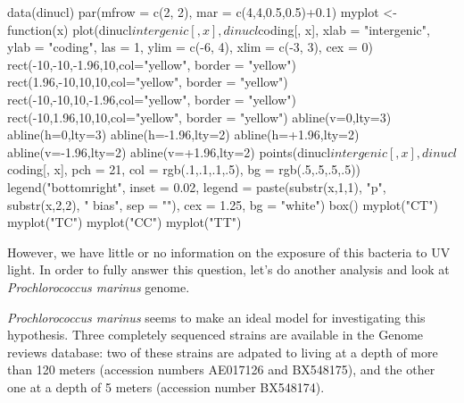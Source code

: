 \documentclass{article}
\begin{document}
\begin{Schunk}
\begin{Sinput}
 data(dinucl)
 par(mfrow = c(2, 2), mar = c(4,4,0.5,0.5)+0.1)
 myplot <- function(x){
   plot(dinucl$intergenic[, x], dinucl$coding[, x],
   xlab = "intergenic", ylab = "coding", 
   las = 1, ylim = c(-6, 4), 
   xlim = c(-3, 3), cex = 0)
   rect(-10,-10,-1.96,10,col="yellow", border = "yellow")
   rect(1.96,-10,10,10,col="yellow", border = "yellow")
   rect(-10,-10,10,-1.96,col="yellow", border = "yellow")
   rect(-10,1.96,10,10,col="yellow", border = "yellow")
   abline(v=0,lty=3)
   abline(h=0,lty=3)
   abline(h=-1.96,lty=2)
   abline(h=+1.96,lty=2)
   abline(v=-1.96,lty=2)
   abline(v=+1.96,lty=2)
   points(dinucl$intergenic[, x], dinucl$coding[, x], pch = 21,
   col = rgb(.1,.1,.1,.5), bg = rgb(.5,.5,.5,.5))
   legend("bottomright", inset = 0.02, legend = paste(substr(x,1,1), "p", substr(x,2,2), " bias", sep = ""), cex = 1.25, bg = "white")
   box()
 }
 myplot("CT")
 myplot("TC")
 myplot("CC")
 myplot("TT")
\end{Sinput}
\end{Schunk}

\begin{figure}
\centering{}\end{figure}

However, we have little or no information on the exposure of this
bacteria to UV light. In order to fully answer this question, let's do
another analysis and look at \textit{Prochlorococcus marinus} genome.

\textit{Prochlorococcus marinus} seems to make an ideal model for
investigating this hypothesis. Three completely sequenced strains are
available in the Genome reviews database: two of these strains are
adpated to living at a depth of more than 120 meters (accession
numbers AE017126 and BX548175), and the other one at a depth of 5
meters (accession number BX548174).
\end{document}
